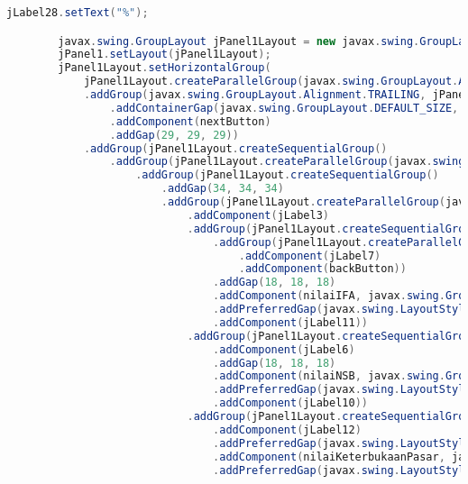 \begin{lstlisting}[language=Java, caption=TampilanKondisiEksternal.java]
        jLabel28.setText("%");

        javax.swing.GroupLayout jPanel1Layout = new javax.swing.GroupLayout(jPanel1);
        jPanel1.setLayout(jPanel1Layout);
        jPanel1Layout.setHorizontalGroup(
            jPanel1Layout.createParallelGroup(javax.swing.GroupLayout.Alignment.LEADING)
            .addGroup(javax.swing.GroupLayout.Alignment.TRAILING, jPanel1Layout.createSequentialGroup()
                .addContainerGap(javax.swing.GroupLayout.DEFAULT_SIZE, Short.MAX_VALUE)
                .addComponent(nextButton)
                .addGap(29, 29, 29))
            .addGroup(jPanel1Layout.createSequentialGroup()
                .addGroup(jPanel1Layout.createParallelGroup(javax.swing.GroupLayout.Alignment.LEADING)
                    .addGroup(jPanel1Layout.createSequentialGroup()
                        .addGap(34, 34, 34)
                        .addGroup(jPanel1Layout.createParallelGroup(javax.swing.GroupLayout.Alignment.LEADING)
                            .addComponent(jLabel3)
                            .addGroup(jPanel1Layout.createSequentialGroup()
                                .addGroup(jPanel1Layout.createParallelGroup(javax.swing.GroupLayout.Alignment.LEADING)
                                    .addComponent(jLabel7)
                                    .addComponent(backButton))
                                .addGap(18, 18, 18)
                                .addComponent(nilaiIFA, javax.swing.GroupLayout.PREFERRED_SIZE, 48, javax.swing.GroupLayout.PREFERRED_SIZE)
                                .addPreferredGap(javax.swing.LayoutStyle.ComponentPlacement.UNRELATED)
                                .addComponent(jLabel11))
                            .addGroup(jPanel1Layout.createSequentialGroup()
                                .addComponent(jLabel6)
                                .addGap(18, 18, 18)
                                .addComponent(nilaiNSB, javax.swing.GroupLayout.PREFERRED_SIZE, 48, javax.swing.GroupLayout.PREFERRED_SIZE)
                                .addPreferredGap(javax.swing.LayoutStyle.ComponentPlacement.RELATED)
                                .addComponent(jLabel10))
                            .addGroup(jPanel1Layout.createSequentialGroup()
                                .addComponent(jLabel12)
                                .addPreferredGap(javax.swing.LayoutStyle.ComponentPlacement.UNRELATED)
                                .addComponent(nilaiKeterbukaanPasar, javax.swing.GroupLayout.PREFERRED_SIZE, 51, javax.swing.GroupLayout.PREFERRED_SIZE)
                                .addPreferredGap(javax.swing.LayoutStyle.ComponentPlacement.UNRELATED)

\end{lstlisting}
